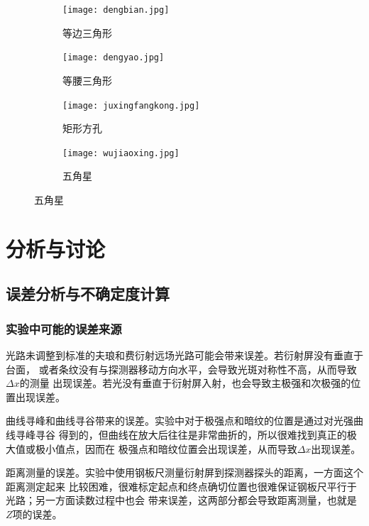 \documentclass{article}
\begin{document}
    \newpage
    
    \begin{figure}
        \centering
        \begin{subfigure}[b]{0.45\textwidth}
            \texttt{[image: dengbian.jpg]}
            \caption{等边三角形}
        \end{subfigure}
        \begin{subfigure}[b]{0.45\textwidth}
            \texttt{[image: dengyao.jpg]}
            \caption{等腰三角形}    
        \end{subfigure}

        \begin{subfigure}[b]{0.45\textwidth}
            \texttt{[image: juxingfangkong.jpg]}
            \caption{矩形方孔}
        \end{subfigure}
        \begin{subfigure}[b]{0.45\textwidth}
            \texttt{[image: wujiaoxing.jpg]}
            \caption{五角星}    
        \end{subfigure}
    \end{figure}

    \section{分析与讨论}
    
    \subsection{误差分析与不确定度计算}
    \subsubsection{实验中可能的误差来源}
    光路未调整到标准的夫琅和费衍射远场光路可能会带来误差。若衍射屏没有垂直于台面，
    或者条纹没有与探测器移动方向水平，会导致光斑对称性不高，从而导致$\Delta x$的测量
    出现误差。若光没有垂直于衍射屏入射，也会导致主极强和次极强的位置出现误差。

    曲线寻峰和曲线寻谷带来的误差。实验中对于极强点和暗纹的位置是通过对光强曲线寻峰寻谷
    得到的，但曲线在放大后往往是非常曲折的，所以很难找到真正的极大值或极小值点，因而在
    极强点和暗纹位置会出现误差，从而导致$\Delta x$出现误差。

    距离测量的误差。实验中使用钢板尺测量衍射屏到探测器探头的距离，一方面这个距离测定起来
    比较困难，很难标定起点和终点确切位置也很难保证钢板尺平行于光路；另一方面读数过程中也会
    带来误差，这两部分都会导致距离测量，也就是$Z$项的误差。
\end{document}
